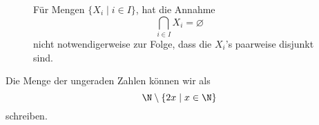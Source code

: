 \begin{figure*}[h]
   \begin{remark}\label{rk:disjunkt-paarweisedisjunkt}
       Für Mengen $\{X_i\mid i \in I \}$, hat die Annahme
       \[
           \bigcap_{i\in I}X_i=\varnothing
       \]
       nicht notwendigerweise zur Folge, dass die $X_i$'s paarweise disjunkt sind.
        \begin{center}
            \begin{framed}
                \def\firstcircle{(-4.5,2) circle (0.5cm)}
                \def\secondcircle{(-5.4,2) circle (0.5cm)}
                \def\thirdcircle{(-7,2) circle (0.5cm)}
                \def\firstcircleA{(0,2) circle (0.5cm)}
                \def\secondcircleA{(1.1,2) circle (0.5cm)}
                \def\thirdcircleA{(2.2,2) circle (0.5cm)}


                \setlength{\parskip}{5mm}
            \end{framed}
        \end{center}
    \end{remark}
\end{figure*}

\begin{example}
Die Menge der ungeraden Zahlen können wir als
\[
\N\setminus\{2x\mid x\in\N\}
\]
schreiben.
\end{example}

